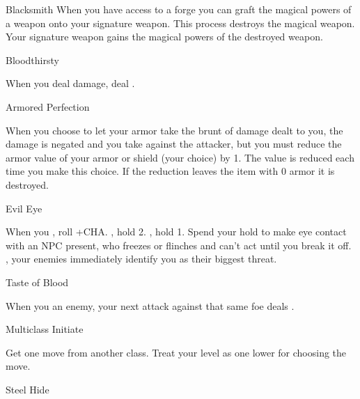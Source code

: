 \documentclass[8pt]{extarticle}
\begin{document}
\begin{multicols}{2}
\begin{amove}{Blacksmith}
  When you have access to a forge you can graft the magical powers of
  a weapon onto your signature weapon. This process destroys the
  magical weapon. Your signature weapon gains the magical powers of
  the destroyed weapon.
\end{amove}


\vfill\null
\columnbreak

\secondAdvances

\begin{amove}{Bloodthirsty}

  When you deal damage, deal .
\end{amove}

\begin{amove}{Armored Perfection}

  When you choose to let your armor take the brunt of damage dealt to
  you, the damage is negated and you take  against the
  attacker, but you must reduce the armor value of your armor or
  shield (your choice) by 1. The value is reduced each time you make
  this choice. If the reduction leaves the item with 0 armor it is
  destroyed.
\end{amove}

\begin{amove}{Evil Eye}

  When you , roll +CHA. \onSuccess, hold
  2. \onPartial, hold 1. Spend your hold to make eye contact with an
  NPC present, who freezes or flinches and can’t act until you break
  it off. \onMiss, your enemies immediately identify you as their
  biggest threat.
\end{amove}

\begin{amove}{Taste of Blood}

  When you  an enemy, your next attack against
  that same foe deals .
\end{amove}

\begin{amove}{Multiclass Initiate}

  Get one move from another class. Treat your level as one lower for
  choosing the move.
\end{amove}

\begin{amove}{Steel Hide}


\end{amove}
\end{multicols}
\end{document}
